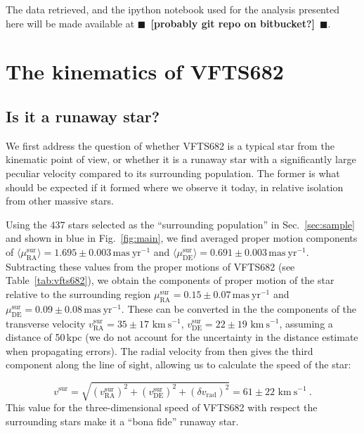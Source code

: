 \documentclass{aa}
\newcommand{\todo}[1]{{\large $\blacksquare$~\textbf{\color{red}[#1]}}~$\blacksquare$}
\newcommand{\kms}{{\,\mathrm{km\ s^{-1}}}}
\DeclareRobustCommand{\Figref}[1]{Fig.~\ref{#1}}
\DeclareRobustCommand{\Tabref}[1]{Table~\ref{#1}}
\DeclareRobustCommand{\Secref}[1]{Sec.~\ref{#1}}
\begin{document}
The data retrieved, and the ipython notebook used for the analysis
presented here will be made available at \todo{probably git repo on bitbucket?}. 

\section{The kinematics of VFTS682}
\label{sec:results}

\subsection{Is it a runaway star?}
\label{sec:runaway}
We first address the question of whether VFTS682 is a typical star
from the kinematic point of view, or whether it is a runaway star with
a significantly large peculiar velocity compared to its surrounding population. The former is what should
be expected if it formed where we observe it today, in relative
isolation from other massive stars.

Using the 437 stars selected as the ``surrounding population'' in
\Secref{sec:sample} and shown in blue in \Figref{fig:main}, we find averaged proper motion components of
$\langle\mu_\mathrm{RA}^\mathrm{sur}\rangle = 1.695\pm0.003\,\mathrm{mas\ yr^{-1}}$ and
$\langle\mu_\mathrm{DE}^\mathrm{sur}\rangle = 0.691\pm0.003\,\mathrm{mas\ yr^{-1}}$. Subtracting these values from the
proper motions of VFTS682 (see \Tabref{tab:vfts682}), we obtain the
components of proper motion of the star relative to the surrounding region
$\mu^\mathrm{sur}_\mathrm{RA} = 0.15\pm 0.07\,\mathrm{mas\ yr^{-1}}$ and $\mu^\mathrm{sur}_\mathrm{DE} =
0.09\pm 0.08\,\mathrm{mas\ yr^{-1}}$. %
These can be converted in the
the components of the transverse velocity $v^\mathrm{sur}_\mathrm{RA}=35\pm17\,\kms$,
$v^\mathrm{sur}_\mathrm{DE}=22\pm19\,\kms$, assuming a distance of
50\,kpc (we do not account for the uncertainty in the distance
estimate when propagating errors). The radial velocity from
\cite{bestenlehner:11} then gives the third component along
the line of sight, allowing us to calculate the speed of the star:

\begin{equation}
  \label{eq:speed_around}
  v^\mathrm{sur} = \sqrt{\left(v^\mathrm{sur}_\mathrm{RA}\right)^2
    +\left(v^\mathrm{sur}_\mathrm{DE}\right)^2+\left(\delta v_\mathrm{rad}\right)^2} = 61 \pm 22
  \, \kms \ .
\end{equation}
This value for the three-dimensional speed of VFTS682 with respect the
surrounding stars make it a ``bona fide'' runaway star.
\end{document}
